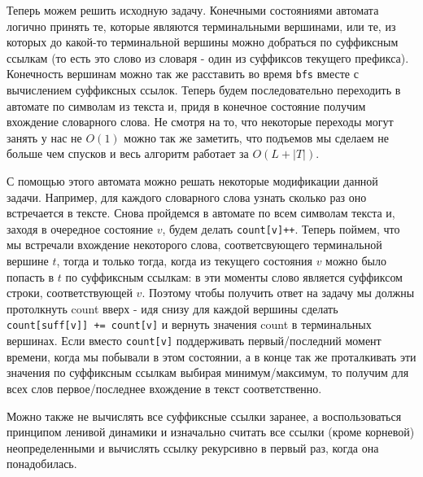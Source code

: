 Теперь можем решить исходную задачу. Конечными состояниями автомата логично принять те, которые являются терминальными вершинами, или те, из которых до какой-то терминальной вершины можно добраться по суффиксным ссылкам (то есть это слово из словаря - один из суффиксов текущего префикса). Конечность вершинам можно так же расставить во время \texttt{bfs} вместе с вычислением суффиксных ссылок. Теперь будем последовательно переходить в автомате по символам из текста и, придя в конечное состояние получим вхождение словарного слова. Не смотря на то, что некоторые переходы могут занять у нас не $O(1)$ можно так же заметить, что подъемов мы сделаем не больше чем спусков и весь алгоритм работает за $O(L + |T|)$.

С помощью этого автомата можно решать некоторые модификации данной задачи. Например, для каждого словарного слова узнать сколько раз оно встречается в тексте. Снова пройдемся в автомате по  всем символам текста и, заходя в очередное состояние $v$, будем делать \texttt{count[v]++}. Теперь поймем, что мы встречали вхождение некоторого слова, соответсвующего терминальной вершине $t$, тогда и только тогда, когда из текущего состояния $v$ можно было попасть в $t$ по суффиксным ссылкам: в эти моменты слово является суффиксом строки, соответствующей $v$. Поэтому чтобы получить ответ на задачу мы должны протолкнуть count вверх - идя снизу для каждой вершины сделать \texttt{count[suff[v]] += count[v]} и вернуть значения count в терминальных вершинах. Если вместо \texttt{count[v]} поддерживать первый/последний момент времени, когда мы побывали в этом состоянии, а в конце так же проталкивать эти значения по суффиксным ссылкам выбирая минимум/максимум, то получим для всех слов первое/последнее вхождение в текст соответственно.

Можно также не вычислять все суффиксные ссылки заранее, а воспользоваться принципом ленивой динамики и изначально считать все ссылки (кроме корневой) неопределенными и вычислять ссылку рекурсивно в первый раз, когда она понадобилась.
